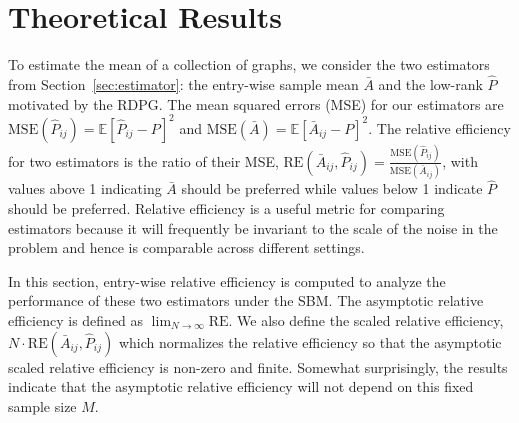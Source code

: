 \documentclass[journal,twoside,web]{ieeecolor}
\renewcommand{\Re}{\mathbb{R}}
\newcommand{\Ex}{\mathbb{E}}
\begin{document}


\section{Theoretical Results}
\label{section:theoretical_result}
To estimate the mean of a collection of graphs, we consider the two estimators from Section~\ref{sec:estimator}: the entry-wise sample mean $\bar{A}$ and the low-rank $\hat{P}$ motivated by the RDPG.
The mean squared errors (MSE) for our estimators are $\mathrm{MSE}(\hat{P}_{ij})=\Ex[\hat{P}_{ij}-P]^2$ and $\mathrm{MSE}(\bar{A})=\Ex[\bar{A}_{ij}-P]^2$.
The relative efficiency for two estimators is the ratio of their MSE, $\mathrm{RE}(\bar{A}_{ij},\hat{P}_{ij}) = \frac{\mathrm{MSE}(\hat{P}_{ij})}{\mathrm{MSE}(\bar{A}_{ij})}$, with values above 1 indicating $\bar{A}$ should be preferred while values below 1 indicate $\hat{P}$ should be preferred.
Relative efficiency is a useful metric for comparing estimators because it will frequently be invariant to the scale of the noise in the problem and hence is comparable across different settings.

In this section, entry-wise relative efficiency is computed to analyze the performance of these two estimators under the SBM.
The asymptotic relative efficiency is defined as $\lim_{N\to \infty}\mathrm{RE}$.
We also define the scaled relative efficiency, $N\cdot \mathrm{RE}(\bar{A}_{ij},\hat{P}_{ij})$ which normalizes the relative efficiency so that the asymptotic scaled relative efficiency is non-zero and finite.
Somewhat surprisingly, the results indicate that the asymptotic relative efficiency will not depend on this fixed sample size $M$.

\end{document}
